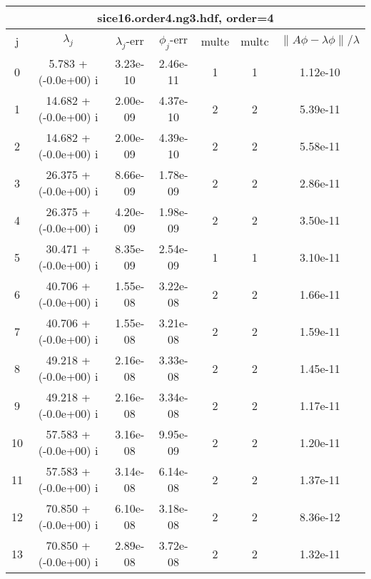 \begin{table}[H]\tableFont %
\begin{center}
\begin{tabular}{|c|c|c|c|c|c|c|}  \hline
\multicolumn{7}{|c|}{sice16.order4.ng3.hdf, order=4} \\ \hline
   j    &         $\lambda_j$        & $\lambda_j$-err  & $\phi_j$-err  & multe & multc & $\| A\phi - \lambda\phi\|/\lambda$     \\ \hline
     0  &      5.783 + (-0.0e+00) i  &    3.23e-10      &   2.46e-11    &   1    &  1   &    1.12e-10 \\
     1  &     14.682 + (-0.0e+00) i  &    2.00e-09      &   4.37e-10    &   2    &  2   &    5.39e-11 \\
     2  &     14.682 + (-0.0e+00) i  &    2.00e-09      &   4.39e-10    &   2    &  2   &    5.58e-11 \\
     3  &     26.375 + (-0.0e+00) i  &    8.66e-09      &   1.78e-09    &   2    &  2   &    2.86e-11 \\
     4  &     26.375 + (-0.0e+00) i  &    4.20e-09      &   1.98e-09    &   2    &  2   &    3.50e-11 \\
     5  &     30.471 + (-0.0e+00) i  &    8.35e-09      &   2.54e-09    &   1    &  1   &    3.10e-11 \\
     6  &     40.706 + (-0.0e+00) i  &    1.55e-08      &   3.22e-08    &   2    &  2   &    1.66e-11 \\
     7  &     40.706 + (-0.0e+00) i  &    1.55e-08      &   3.21e-08    &   2    &  2   &    1.59e-11 \\
     8  &     49.218 + (-0.0e+00) i  &    2.16e-08      &   3.33e-08    &   2    &  2   &    1.45e-11 \\
     9  &     49.218 + (-0.0e+00) i  &    2.16e-08      &   3.34e-08    &   2    &  2   &    1.17e-11 \\
    10  &     57.583 + (-0.0e+00) i  &    3.16e-08      &   9.95e-09    &   2    &  2   &    1.20e-11 \\
    11  &     57.583 + (-0.0e+00) i  &    3.14e-08      &   6.14e-08    &   2    &  2   &    1.37e-11 \\
    12  &     70.850 + (-0.0e+00) i  &    6.10e-08      &   3.18e-08    &   2    &  2   &    8.36e-12 \\
    13  &     70.850 + (-0.0e+00) i  &    2.89e-08      &   3.72e-08    &   2    &  2   &    1.32e-11 \\

\end{tabular}
\end{center}
\end{table}

